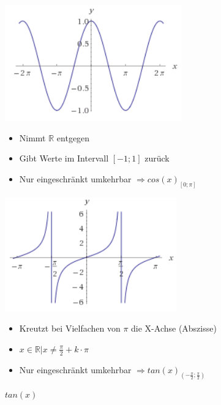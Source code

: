 \begin{figure}[ht!]
	\centering
	\begin{minipage}[t]{0.4\textwidth}
		\centering
		\includegraphics[width=\textwidth]{images/graph_cos_x}
		\caption{$cos(x)$}
		\begin{itemize}
			\item Nimmt $\mathbb{R}$ entgegen
			\item Gibt Werte im Intervall $\left[-1;1\right]$ zurück
			\item Nur eingeschränkt umkehrbar $\Rightarrow cos(x)_{[0;\pi]}$
		\end{itemize}
	\end{minipage}
	\begin{minipage}[t]{0.4\textwidth}
		\centering
		\includegraphics[width=\textwidth]{images/graph_tan_x}
		\caption{$tan(x)$}
		\begin{itemize}
			\item Kreutzt bei Vielfachen von $\pi$ die X-Achse (Abszisse)
			\item $x \in \mathbb{R} | x \neq \frac{\pi}{2} + k \cdot \pi$
			\item Nur eingeschränkt umkehrbar $\Rightarrow tan(x)_{(-\frac{\pi}{2};\frac{\pi}{2})}$
		\end{itemize}
	\end{minipage}
\end{figure}
